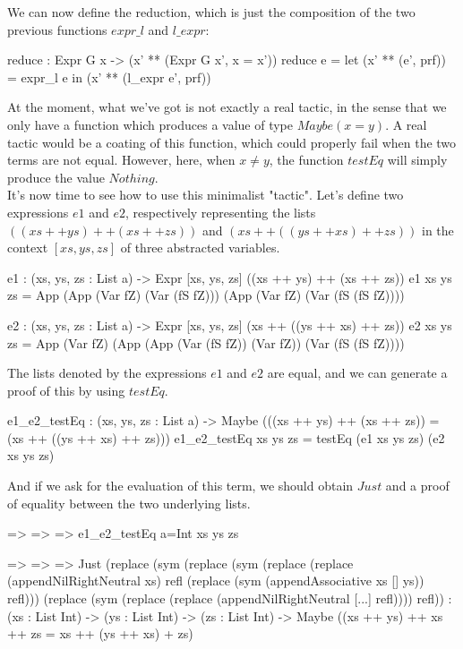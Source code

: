 \documentclass{sigplanconf}
\begin{document}
We can now define the reduction, which is just the composition of the two previous functions $expr\_l$ and $l\_expr$:

\begin{code}[caption=Reduction function, captionpos=b, label=lst1:haskell2]
  reduce : Expr G x -> 
           (x' ** (Expr G x', x = x'))
  reduce e = 
     let (x' ** (e', prf)) = expr_l e in
        (x' ** (l_expr e', prf))
\end{code}

At the moment, what we've got is not exactly a real tactic, in the sense that we only have a function which produces a value of type $Maybe (x = y)$. A real tactic would be a coating of this function, which could properly fail when the two terms are not equal. However, here, when $x\ne y$, the function $testEq$ will simply produce the value $Nothing$. \\
It's now time to see how to use this minimalist "tactic".
Let's define two expressions $e1$ and $e2$, respectively representing the lists $((xs ++ ys) ++ (xs ++ zs))$ and $(xs ++ ((ys ++ xs) ++ zs))$ in the context $[xs, ys, zs]$ of three abstracted variables.

\begin{code}[caption=Two test expressions, captionpos=b, label=lst1:haskell2]
  e1 : (xs, ys, zs : List a) -> 
           Expr [xs, ys, zs] 
           ((xs ++ ys) ++ (xs ++ zs))
  e1 xs ys zs = 
     App (App (Var fZ) (Var (fS fZ))) 
         (App (Var fZ) (Var (fS (fS fZ))))

  e2 : (xs, ys, zs : List a) -> 
           Expr [xs, ys, zs] 
           (xs ++ ((ys ++ xs) ++ zs))
  e2 xs ys zs = 
     App (Var fZ) 
         (App (App (Var (fS fZ)) (Var fZ)) 
              (Var (fS (fS fZ))))
\end{code}

The lists denoted by the expressions $e1$ and $e2$ are equal, and we can generate a proof of this by using $testEq$.
\begin{code}[caption=Test of equality betwen e1 and e2, captionpos=b, label=lst1:haskell2]
  e1_e2_testEq : (xs, ys, zs : List a) ->
          Maybe (((xs ++ ys) ++ (xs ++ zs)) = 
                 (xs ++ ((ys ++ xs) ++ zs)))
  e1_e2_testEq xs ys zs = 
     testEq (e1 xs ys zs) (e2 xs ys zs) 
\end{code}

And if we ask for the evaluation of this term, we should obtain $Just$ and a proof of equality between the two underlying lists.
\begin{code}[caption=Evaluation of the result, captionpos=b, label=lst1:haskell2]
\xs => \ys => \zs => e1_e2_testEq {a=Int} xs ys zs

\xs => \ys => \zs => Just (replace (sym (replace 
(sym (replace (replace (appendNilRightNeutral xs)
 refl (replace (sym (appendAssociative xs [] ys)) 
 refl))) (replace (sym (replace (replace 
 (appendNilRightNeutral [...] refl)))) refl)) 
: (xs : List Int) -> (ys : List Int) -> 
  (zs : List Int) -> 
  Maybe ((xs ++ ys) ++ xs ++ zs 
         = xs ++ (ys ++ xs) + zs)
\end{code}
\end{document}
